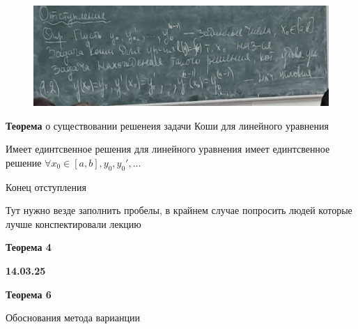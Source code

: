 \documentclass{article}
\begin{document}
\begin{figure}[H]
    \centering
    \includegraphics[width=1\linewidth]{Снимок экрана 2025-03-07 103827.png}
\end{figure}


\textbf{Теорема} о существовании решенеия задачи Коши для линейного уравнения

Имеет единтсвенное решения для линейного уравнения имеет единтсвенное решение
$\forall x_0 \in [a,b], y_0, y_0',...$


Конец отступления


Тут нужно везде заполнить пробелы, в крайнем случае попросить людей которые лучше конспектировали лекцию


\textbf{Теорема 4}




\textbf{14.03.25}


\textbf{Теорема 6}


Обоснования метода варианции
\end{document}
